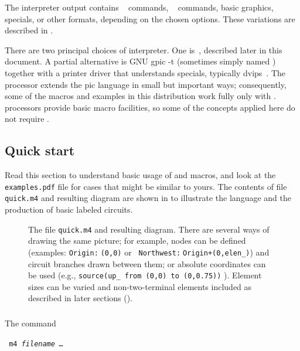 \noindent
The interpreter output contains
\TPGF~\cite{tikz} commands,
\PSTricks~\cite{pstricks} commands,
basic \latex graphics, 
\tpic specials, or other formats,
depending on the chosen options.
These variations are described in .

There are two principal choices of \pic interpreter.  One is~\dpic,
described later in this document.  A partial alternative is
GNU {\bq gpic -t} (sometimes simply named \pic)~\cite{gpic}
together with a printer driver
that understands \tpic specials, typically {\bq dvips}~\cite{dvips}.
The \dpic processor extends the pic language in small but important ways;
consequently, some of the macros and examples in this distribution work fully
only with \dpic.
\Pic processors provide basic macro facilities, so some of the
concepts applied here do not require \Mfour.

\subsection{Quick start\label{Quickstart:}}
Read this section to understand basic usage of \Mfour and macros,
and look at the {\tt examples.pdf} file for cases
that might be similar to yours.
The contents of file {\tt quick.m4} and resulting diagram are shown
in  to illustrate the language and the production of basic
labeled circuits.
\begin{figure}[ht]
   \parbox{\textwidth}{\small}%
   \hfill\llap{\raise-1in\hbox{ }}%
   \caption{The file {\tt quick.m4} and resulting diagram.
     There are several ways of drawing the same picture; for example,
     nodes can be defined (examples: {\tt Origin:$\;$(0,0)} or {\tt
     Northwest:$\;$Origin+(0,elen\_)}) and circuit branches drawn between them;
     or absolute coordinates can be used (e.g., {\tt source(up\_
     from (0,0) to (0,0.75))} ).  Element sizes can be varied and
     non-two-terminal elements included as described in later sections
     ().\label{quick}}%
   \end{figure}

\subsubsection{%
\label{Usingmfour:}}
The command

  {\vspace*\parsep\tt
    m4 {\sl filename \ldots}
   \vspace*\parsep}

